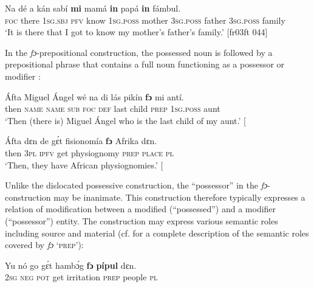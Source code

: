 \ea%
    \label{ex:key:241}
    \gll Na  dé    a    kán  sabí    \textbf{mi}    mamá  \textbf{in}    papá
\textbf{in}    fámbul. \\
\textsc{foc}  there  \textsc{1sg.sbj}  \textsc{pfv}  know  \textsc{1sg.poss}  mother  \textsc{3sg.poss}  father
\textsc{3sg.poss}  family\\

\glt ‘It is there that I got to know my mother’s father’s family.’ [fr03ft 044]
\z

In the \textit{fɔ}-prepositional construction, the possessed noun is followed by a prepositional phrase that contains a full noun functioning as a possessor  or modifier : 


\ea%
    \label{ex:key:242}
    \gll \'{A}fta    Miguel  Ángel  wé  na  di  lás  pikín  \textbf{fɔ} mi    antí.\\
then  \textsc{name}  \textsc{name}  \textsc{sub}  \textsc{foc}  \textsc{def}  last  child  \textsc{prep}  \textsc{1sg.poss}  aunt\\

\glt ‘Then (there is) Miguel Ángel who is the last child of my aunt.’ [\textstylePichiexamplenumberZchnZchn{fr03ft 143]}
\z


\ea%
    \label{ex:key:243}
    \gll \'{A}fta    dɛn  de  gɛ́t  fisionomía  \textbf{fɔ}  Afrika  dɛn.\\
then  \textsc{3pl}  \textsc{ipfv}  get  physiognomy  \textsc{prep}  \textsc{place}  \textsc{pl}\\

\glt ‘Then, they have African physiognomies.’ [\textstylePichiexamplenumberZchnZchn{ed03sp 031]}
\z

Unlike the dislocated possessive construction, the “possessor” in the \textit{fɔ}-construction may be inanimate. This construction therefore typically expresses a relation of modification between a modified (“possessed”) and a modifier (“possessor”) entity. The construction may express various semantic roles including source\index{}  and material\index{}  (cf.  for a complete description of the semantic roles covered by \textit{fɔ} ‘\textsc{prep’}):


\ea%
    \label{ex:key:244}
    \gll Yu  nó  go  gɛ́t  hambɔ́g  \textbf{fɔ}  \textbf{pípul}  dɛn.\\
\textsc{2sg}  \textsc{neg}  \textsc{pot}  get  irritation  \textsc{prep}  people  \textsc{pl}\\

